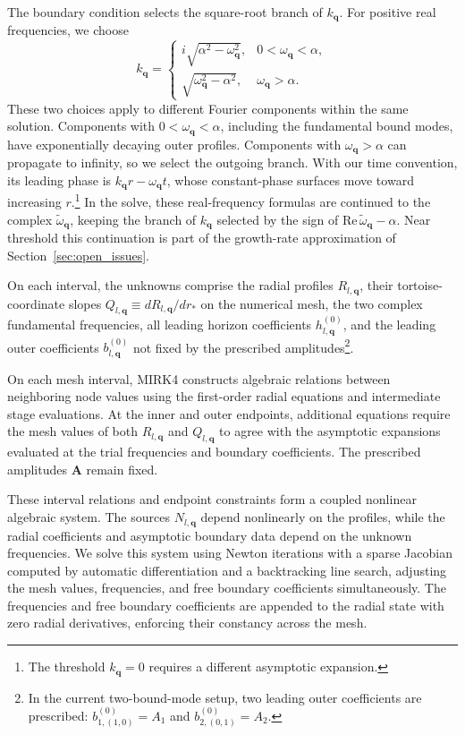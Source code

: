 \documentclass[11pt]{article}
\begin{document}
The boundary condition selects the square-root branch of $k_{\mathbf q}$. For positive real frequencies, we choose
\begin{equation}
    k_{\mathbf q}=
    \begin{cases}
        i\sqrt{\alpha^2-\omega_{\mathbf q}^2}, & 0<\omega_{\mathbf q}<\alpha,\\
        \sqrt{\omega_{\mathbf q}^2-\alpha^2}, & \omega_{\mathbf q}>\alpha.
    \end{cases}
\end{equation}
These two choices apply to different Fourier components within the same solution. Components with $0<\omega_{\mathbf q}<\alpha$, including the fundamental bound modes, have exponentially decaying outer profiles. Components with $\omega_{\mathbf q}>\alpha$ can propagate to infinity, so we select the outgoing branch. With our time convention, its leading phase is $k_{\mathbf q}r-\omega_{\mathbf q}t$, whose constant-phase surfaces move toward increasing $r$.\footnote{The threshold $k_{\mathbf q}=0$ requires a different asymptotic expansion.} In the solve, these real-frequency formulas are continued to the complex $\tilde\omega_{\mathbf q}$, keeping the branch of $k_{\mathbf q}$ selected by the sign of $\mathrm{Re}\,\tilde\omega_{\mathbf q}-\alpha$. Near threshold this continuation is part of the growth-rate approximation of Section~\ref{sec:open_issues}.

On each interval, the unknowns comprise the radial profiles $R_{l,\mathbf{q}}$, their tortoise-coordinate slopes $Q_{l,\mathbf{q}} \equiv dR_{l,\mathbf{q}}/dr_*$ on the numerical mesh, the two complex fundamental frequencies, all leading horizon coefficients $h_{l,\mathbf{q}}^{(0)}$, and the leading outer coefficients $b_{l,\mathbf{q}}^{(0)}$ not fixed by the prescribed amplitudes\footnote{In the current two-bound-mode setup, two leading outer coefficients are prescribed: $b^{(0)}_{1,(1,0)}=A_1$ and $b^{(0)}_{2,(0,1)}=A_2$.}.

On each mesh interval, MIRK4 constructs algebraic relations between neighboring node values using the first-order radial equations and intermediate stage evaluations. At the inner and outer endpoints, additional equations require the mesh values of both $R_{l,\mathbf q}$ and $Q_{l,\mathbf q}$ to agree with the asymptotic expansions evaluated at the trial frequencies and boundary coefficients. The prescribed amplitudes $\mathbf A$ remain fixed.

These interval relations and endpoint constraints form a coupled nonlinear algebraic system. The sources $N_{l,\mathbf q}$ depend nonlinearly on the profiles, while the radial coefficients and asymptotic boundary data depend on the unknown frequencies. We solve this system using Newton iterations with a sparse Jacobian computed by automatic differentiation and a backtracking line search, adjusting the mesh values, frequencies, and free boundary coefficients simultaneously. The frequencies and free boundary coefficients are appended to the radial state with zero radial derivatives, enforcing their constancy across the mesh.
\end{document}
